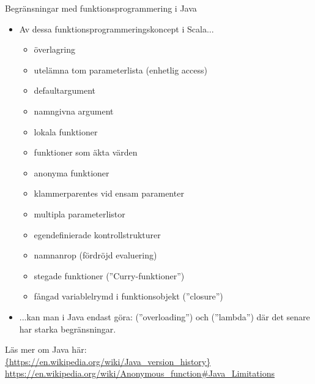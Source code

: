 \begin{Slide}{Begränsningar med funktionsprogrammering i Java}
\begin{itemize}\SlideFontTiny
\item[] Av dessa funktionsprogrammeringskoncept i Scala...
\begin{itemize}
\item överlagring
\item utelämna tom parameterlista (enhetlig access)
\item defaultargument
\item namngivna argument
\item lokala funktioner
\item funktioner som äkta värden
\item anonyma funktioner
\item klammerparentes vid ensam paramenter
\item multipla parameterlistor
\item egendefinierade kontrollstrukturer
\item namnanrop (fördröjd evaluering)
\item stegade funktioner (''Curry-funktioner'')
\item fångad variablelrymd i funktionsobjekt (''closure'')
\end{itemize}
\item[] ...kan man i Java %
endast göra:  (''overloading'') och  (''lambda'') där det senare har starka begränsningar. %

\end{itemize}
\ifkompendium\else
\vfill{} 
\fi Läs mer om Java här:\\
\url{{https://en.wikipedia.org/wiki/Java_version_history}}
\url{https://en.wikipedia.org/wiki/Anonymous_function\#Java_Limitations}

\end{Slide}



